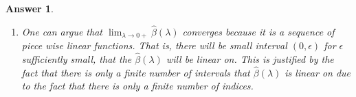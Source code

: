 \documentclass[12pt]{article}
\theoremstyle{colon}
\newtheorem*{answer}{Answer}
\begin{document}
\begin{answer}
\begin{enumerate}[label=\arabic*)]
      \begin{gather*}
        \lambda = \frac{\lambda_1 - \lambda}{\lambda_1 - \lambda_0} \lambda_0 + \frac{\lambda - \lambda_0}{\lambda_1 - \lambda_0} \lambda_1 \\
        \geq \frac{\lambda_1 - \lambda}{\lambda_1 - \lambda_0} \lvert X_j^T (Y - X \widehat{\beta}(\lambda_0)) \rvert + \frac{\lambda - \lambda_0}{\lambda_1 - \lambda_0} \lvert X_j^T (Y - X \widehat{\beta}(\lambda_1)) \rvert \\
        \geq \lvert X_j^T (Y - X (\frac{\lambda - \lambda_0}{\lambda_1 - \lambda_0}\widehat{\beta}(\lambda_1) +  \frac{\lambda_1 - \lambda}{\lambda_1 - \lambda_0}\widehat{\beta}(\lambda_0))) \rvert \\
        = \lvert X_j^T (Y - X f(\lambda)) \rvert
      \end{gather*}
      Where we used the triangle inequality to combine the absolute values. Thus, $f(\lambda)$ is an optimal solution for all $\lambda \in [\lambda_0, \lambda_1]$. By assumption, there is a unique minimizer. Thus,
      \begin{gather*}
        \widehat{\beta}(\lambda) = f(\lambda) = \widehat{\beta}(\lambda_0) - (\lambda - \lambda_0) \gamma_0
      \end{gather*}
      The Lasso regularization path in Q1.3 was also piecewise linear and has to do with the fact that if $\widehat{\beta}(\lambda)$ is piecewise linear, then we have that the L1 norm is a sum of piecewise linear functions which is piecewise linear.

    \item One can argue that $\lim_{\lambda \rightarrow 0+} \widehat{\beta}(\lambda)$ converges because it is a sequence of piece wise linear functions. That is, there will be small interval $(0,\epsilon)$ for $\epsilon$ sufficiently small, that the $\widehat{\beta}(\lambda)$ will be linear on. This is justified by the fact that there is only a finite number of intervals that $\widehat{\beta}(\lambda)$ is linear on due to the fact that there is only a finite number of indices.
  \end{enumerate}
\end{answer}
\end{document}
